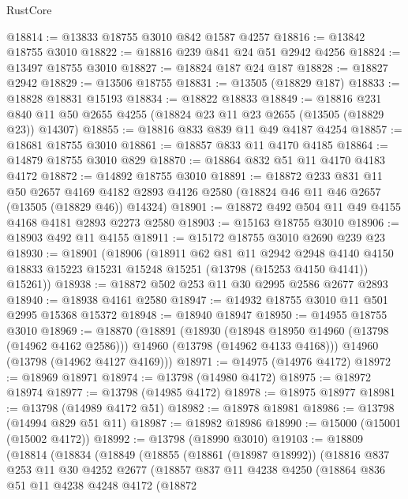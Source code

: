 \begin{lexlean}{RustCore}
\begin{coremodule}
@18814 := @13833 @18755 @3010 @842 @1587 @4257
@18816 := @13842 @18755 @3010
@18822 := @18816 @239 @841 @24 @51 @2942 @4256
@18824 := @13497 @18755 @3010
@18827 := @18824 @187 @24 @187
@18828 := @18827 @2942
@18829 := @13506 @18755
@18831 := @13505 (@18829 @187)
@18833 := @18828 @18831 @15193
@18834 := @18822 @18833
@18849 := @18816
    @231
    @840
    @11
    @50
    @2655
    @4255
    (@18824 @23 @11 @23 @2655 (@13505 (@18829 @23)) @14307)
@18855 := @18816 @833 @839 @11 @49 @4187 @4254
@18857 := @18681 @18755 @3010
@18861 := @18857 @833 @11 @4170 @4185
@18864 := @14879 @18755 @3010 @829
@18870 := @18864 @832 @51 @11 @4170 @4183 @4172
@18872 := @14892 @18755 @3010
@18891 := @18872
    @233
    @831
    @11
    @50
    @2657
    @4169
    @4182
    @2893
    @4126
    @2580
    (@18824 @46 @11 @46 @2657 (@13505 (@18829 @46)) @14324)
@18901 := @18872 @492 @504 @11 @49 @4155 @4168 @4181 @2893 @2273 @2580
@18903 := @15163 @18755 @3010
@18906 := @18903 @492 @11 @4155
@18911 := @15172 @18755 @3010 @2690 @239 @23
@18930 := @18901
    (@18906
      (@18911
        @62
        @81
        @11
        @2942
        @2948
        @4140
        @4150
        @18833
        @15223
        @15231
        @15248
        @15251
        (@13798 (@15253 @4150 @4141))
        @15261))
@18938 := @18872 @502 @253 @11 @30 @2995 @2586 @2677 @2893
@18940 := @18938 @4161 @2580
@18947 := @14932 @18755 @3010 @11 @501 @2995 @15368 @15372
@18948 := @18940 @18947
@18950 := @14955 @18755 @3010
@18969 := @18870
    (@18891
      (@18930
        (@18948 @18950 @14960 (@13798 (@14962 @4162 @2586)))
        @14960
        (@13798 (@14962 @4133 @4168)))
      @14960
      (@13798 (@14962 @4127 @4169)))
@18971 := @14975 (@14976 @4172)
@18972 := @18969 @18971
@18974 := @13798 (@14980 @4172)
@18975 := @18972 @18974
@18977 := @13798 (@14985 @4172)
@18978 := @18975 @18977
@18981 := @13798 (@14989 @4172 @51)
@18982 := @18978 @18981
@18986 := @13798 (@14994 @829 @51 @11)
@18987 := @18982 @18986
@18990 := @15000 (@15001 (@15002 @4172))
@18992 := @13798 (@18990 @3010)
@19103 := @18809
    (@18814
      (@18834
        (@18849
          (@18855
            (@18861 (@18987 @18992))
            (@18816
              @837
              @253
              @11
              @30
              @4252
              @2677
              (@18857
                @837
                @11
                @4238
                @4250
                (@18864
                  @836
                  @51
                  @11
                  @4238
                  @4248
                  @4172
                  (@18872

\end{coremodule}
\end{lexlean}
